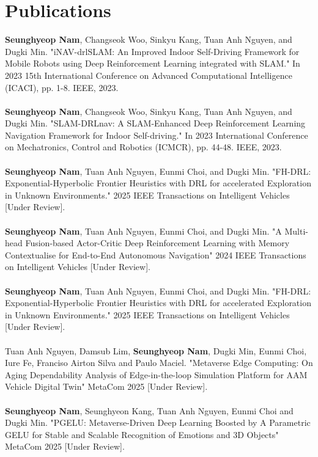 \documentclass[11pt,a4paper]{article}
\begin{document}
\section*{Publications}
\textbf{Seunghyeop Nam}, Changseok Woo, Sinkyu Kang, Tuan Anh Nguyen, and Dugki Min. "iNAV-drlSLAM: An Improved Indoor Self-Driving Framework for Mobile Robots using Deep Reinforcement Learning integrated with SLAM." In 2023 15th International Conference on Advanced Computational Intelligence (ICACI), pp. 1-8. IEEE, 2023. \\ \\
\textbf{Seunghyeop Nam}, Changseok Woo, Sinkyu Kang, Tuan Anh Nguyen, and Dugki Min. "SLAM-DRLnav: A SLAM-Enhanced Deep Reinforcement Learning Navigation Framework for Indoor Self-driving." In 2023 International Conference on Mechatronics, Control and Robotics (ICMCR), pp. 44-48. IEEE, 2023. \\ \\
\textbf{Seunghyeop Nam}, Tuan Anh Nguyen, Eunmi Choi, and Dugki Min. "FH-DRL: Exponential-Hyperbolic Frontier Heuristics with DRL for accelerated Exploration in Unknown Environments." 2025 IEEE Transactions on Intelligent Vehicles [Under Review]. \\ \\
\textbf{Seunghyeop Nam}, Tuan Anh Nguyen, Eunmi Choi, and Dugki Min. "A Multi-head Fusion-based Actor-Critic Deep Reinforcement Learning with Memory Contextualise for End-to-End Autonomous Navigation" 2024 IEEE Transactions on Intelligent Vehicles [Under Review]. \\ \\
\textbf{Seunghyeop Nam}, Tuan Anh Nguyen, Eunmi Choi, and Dugki Min. "FH-DRL: Exponential-Hyperbolic Frontier Heuristics with DRL for accelerated Exploration in Unknown Environments." 2025 IEEE Transactions on Intelligent Vehicles [Under Review]. \\ \\
Tuan Anh Nguyen, Damsub Lim, \textbf{Seunghyeop Nam}, Dugki Min, Eunmi Choi, Iure Fe, Franciso Airton Silva and Paulo Maciel. "Metaverse Edge Computing: On Aging Dependability Analysis of Edge-in-the-loop Simulation Platform for AAM Vehicle Digital Twin" MetaCom 2025 [Under Review]. \\ \\
\textbf{Seunghyeop Nam}, Seunghyeon Kang, Tuan Anh Nguyen, Eunmi Choi and Dugki Min. "PGELU: Metaverse-Driven Deep Learning Boosted by A Parametric GELU for Stable and Scalable Recognition of Emotions and 3D Objects" MetaCom 2025 [Under Review]. \\ \\
\end{document}
